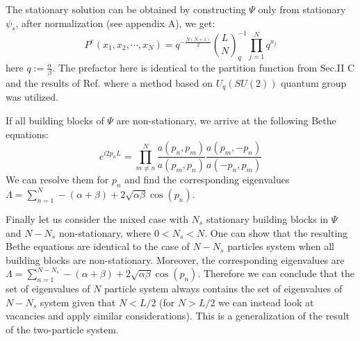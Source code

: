 \documentclass[aps,showpacs,twocolumn,floatfix,prx,superscriptaddress]{revtex4-1}
\begin{document}
The stationary solution can be obtained by constructing $\Psi$ only from stationary $\psi_s$, after normalization (see appendix A), we get: 
\begin{equation}
    \label{eq:stationarySolutionN}
    P^e(x_1, x_2, \cdots, x_N) = q^{-\frac{N(N+1)}{2}}
    \binom{L}{N}_q^{-1}\prod_{j=1}^N{q^{x_j}}
\end{equation}
here $q:=\frac{\alpha}{\beta}$. The prefactor here is identical to the partition function from Sec.II C and the results of Ref.\cite{} where a method based on $U_q(SU(2))$ quantum group was utilized.

If all building blocks of $\Psi$ are non-stationary, we arrive at the following Bethe equations:
\begin{equation}
    \label{eq:betheEqN}
    e^{i2p_nL}  =  \prod_{m\neq n}^N\frac{a(p_n, p_m)}{a(p_m, p_n)} 
    \frac{a(p_m, -p_n)}{a(-p_n, p_m)}
\end{equation}
We can resolve them for $p_n$ and find the corresponding eigenvalues $\Lambda=\sum_{n=1}^N -(\alpha+\beta) + 2\sqrt{\alpha\beta}\cos(p_n)$. 

Finally let us consider the mixed case with $N_s$ stationary building blocks in $\Psi$ and $N-N_s$ non-stationary, where $0<N_s<N$. One can show that the resulting Bethe equations are identical to the case of $N-N_s$ particles system when all building blocks are non-stationary. Moreover, the corresponding eigenvalues are $\Lambda = \sum_{n=1}^{N-N_s} -(\alpha+\beta)+2\sqrt{\alpha\beta}\cos(p_n)$. Therefore we can conclude that the set of eigenvalues of $N$ particle system always contains the set of eigenvalues of $N-N_s$ system given that $N<L/2$ (for $N>L/2$ we can instead look at vacancies and apply similar considerations). This is a generalization of the result of the two-particle system.
\end{document}
